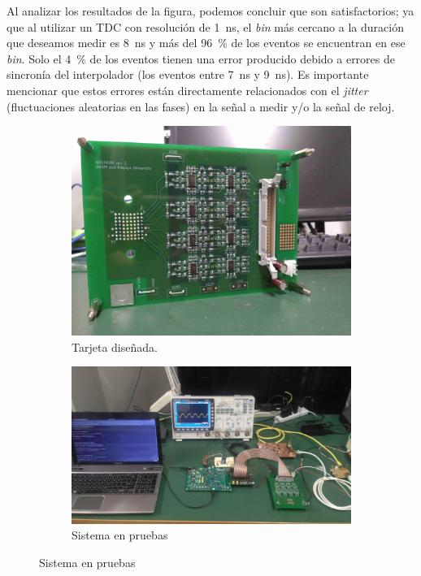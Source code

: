 Al analizar los resultados de la figura, podemos concluir que son satisfactorios; ya que al utilizar un TDC con resolución de \SI{1}{\nano\second}, el \emph{bin} más cercano a la duración que deseamos medir es \SI{8}{\nano\second} y más del \SI{96}{\percent} de los eventos se encuentran en ese \emph{bin}. Solo el \SI{4}{\percent} de los eventos tienen una error producido debido a errores de sincronía del interpolador (los eventos entre \SI{7}{\nano\second} y \SI{9}{\nano\second}). Es importante mencionar que estos errores están directamente relacionados con el \emph{jitter} (fluctuaciones aleatorias en las fases) en la señal a medir y/o la señal de reloj.


\begin{figure}
  \centering
  \begin{subfigure}[b]{0.49\textwidth}
	\includegraphics[width=\textwidth]{neutron_ver1.jpg}
	\caption{Tarjeta diseñada.}
	\label{fig:neutron-pcb}
  \end{subfigure}
  \begin{subfigure}[b]{0.49\textwidth}
	\includegraphics[width=\textwidth]{complete-system.jpg}
	\caption{Sistema en pruebas}
	\label{fig:complete-sys}
  \end{subfigure}
\end{figure}

